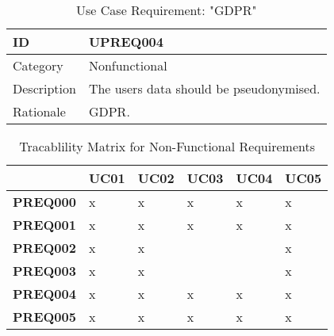 \begin{flushleft}
\vspace{5mm}
\begin{table}[H]
    \begin{tabular}{ |p{2cm}||p{9cm}| }
        \hline
        ID & \textbf{UPREQ004}\\ \hline
        Category & Nonfunctional \\ \hline
        Description & 
        The users data should be pseudonymised.
        \\ \hline
        Rationale & GDPR. \\ \hline 
    \end{tabular} 
\caption{Use Case Requirement: "GDPR"}
\end{table}

\begin{table}[H]    
    \begin{tabular}{|p{2cm}|p{2cm}|p{2cm}|p{2cm}|p{2cm}|p{2cm}|} 
        \hline & \textbf{UC01} & \textbf{UC02} & \textbf{UC03} & \textbf{UC04} & \textbf{UC05} \\ \hline
        \textbf{PREQ000} & x & x & x & x & x \\ \hline
        \textbf{PREQ001} & x & x & x & x & x \\ \hline
        \textbf{PREQ002} & x & x &  &  & x \\ \hline
        \textbf{PREQ003} & x & x &  &  & x \\ \hline
        \textbf{PREQ004} & x & x & x & x & x \\ \hline
        \textbf{PREQ005} & x & x & x & x & x \\ \hline
    \end{tabular}
    \caption{Tracablility Matrix for Non-Functional Requirements}
\end{table}

\end{flushleft}
